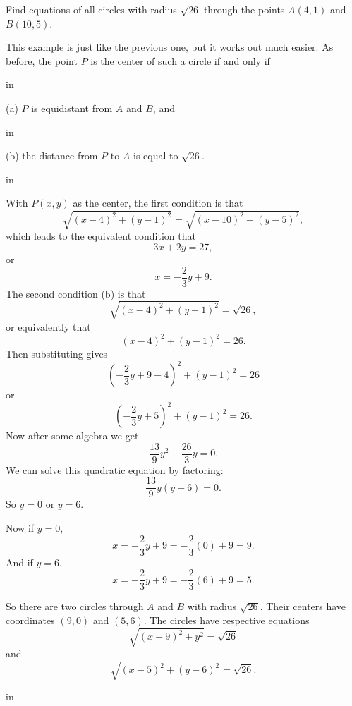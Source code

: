 \documentclass{ximera}
\newcommand{\pskip}{\vskip 0.1 in}
\begin{document}
\begin{example} \label{Ex5a}
Find equations of all circles with radius $\sqrt{26}$ through the points $A(4,1)$ and $B(10,5)$.

\begin{explanation}
This example is just like the previous one, but it works out much easier. As before, the point $P$ is the center of such a circle if and only if

\pskip

(a) $P$ is equidistant from $A$ and $B$, and 

\pskip
 
(b) the distance from $P$ to $A$ is equal to $\sqrt{26}$. 

\pskip

With $P(x,y)$ as the center, the first condition is that
\[
  \sqrt{(x-4)^2 + (y-1)^2} = \sqrt{(x-10)^2+(y-5)^2} ,
\]
 which leads to the equivalent condition that
\[
   3x + 2y = 27 , 
\]
or 
\[
    x = -\frac{2}{3}y + 9 .
\]
The second condition (b) is that
\[
   \sqrt{(x-4)^2 + (y-1)^2} =\sqrt{26} ,
\]
or equivalently that
\[
   (x-4)^2 + (y-1)^2 = 26.
\]
Then substituting gives
\[
    \left( -\frac{2}{3}y+9-4 \right)^2 + (y-1)^2 = 26
\]
or
\[
    \left( -\frac{2}{3}y+5 \right)^2 + (y-1)^2 = 26 .
\]
Now after some algebra we get
\[
   \frac{13}{9}y^2 - \frac{26}{3}y = 0.
\]
We can solve this quadratic equation by factoring:
\[
 \frac{13}{9}y \left(  y-6   \right) = 0 .
\]
So $y=0$ or $y=6$.

Now if $y=0$, 
\[
   x = -\frac{2}{3}y + 9 = -\frac{2}{3}(0) + 9 = 9 .
\]
And if $y=6$, 
\[
x = -\frac{2}{3}y + 9 = -\frac{2}{3}(6) + 9 = 5 .
\]

So there are two circles through $A$ and $B$ with radius $\sqrt{26}$. Their centers have coordinates $(9,0)$ and $(5,6)$. The circles have respective equations
\[
  \sqrt{(x-9)^2 + y^2} =\sqrt{26}
\]
and
\[
\sqrt{(x-5)^2 + (y-6)^2} =\sqrt{26} .
\]

\pskip


\end{explanation}

\end{example}
\end{document}
